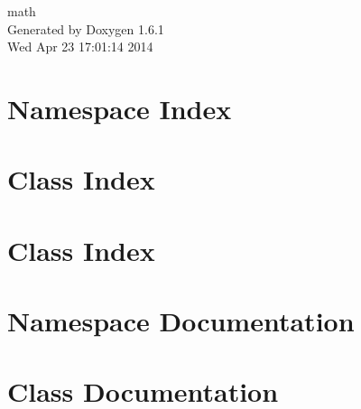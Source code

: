 \documentclass[a4paper]{book}
\begin{document}
\hypersetup{pageanchor=false}
\begin{titlepage}
\vspace*{7cm}
\begin{center}
{\Large math }\\
\vspace*{1cm}
{\large Generated by Doxygen 1.6.1}\\
\vspace*{0.5cm}
{\small Wed Apr 23 17:01:14 2014}\\
\end{center}
\end{titlepage}
\clearemptydoublepage
{}
\tableofcontents
\clearemptydoublepage
{}
\hypersetup{pageanchor=true}
\chapter{Namespace Index}

\chapter{Class Index}

\chapter{Class Index}

\chapter{Namespace Documentation}


\chapter{Class Documentation}






































\printindex
\end{document}
